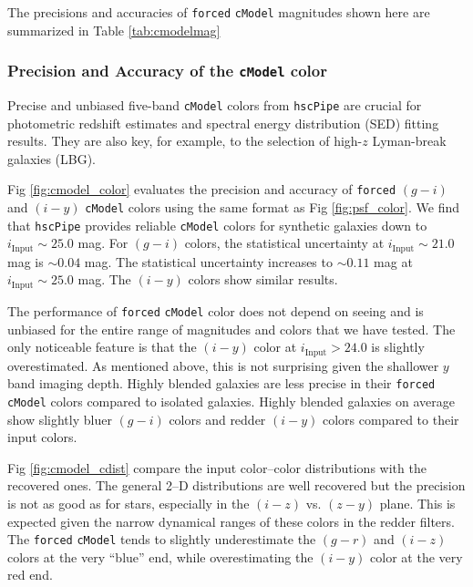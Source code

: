 \documentclass[useamsfonts]{pasj01}
\def\hscpipe{\texttt{hscPipe}}
\def\cmodel{\texttt{cModel}}
\def\forced{\texttt{forced}}
\begin{document}
	The precisions and accuracies of \forced{} \cmodel{} magnitudes shown here are 
	summarized in Table \ref{tab:cmodelmag}

\subsubsection{Precision and Accuracy of the \cmodel{} color}

    Precise and unbiased five-band \cmodel{} colors from \hscpipe{} are crucial for
    photometric redshift estimates and spectral energy distribution (SED) fitting 
    results. 
    They are also key, for example, to the selection of high-$z$ Lyman-break 
    galaxies (LBG).

    Fig \ref{fig:cmodel_color} evaluates the precision and accuracy of \forced{} 
    $(g-i)$ and $(i-y)$ \cmodel{} colors using the same format as 
    Fig \ref{fig:psf_color}. 
    We find that \hscpipe{} provides reliable \cmodel{} colors for synthetic 
    galaxies down to $i_{\mathrm{Input}}{\sim}25.0$ mag.
    For $(g-i)$ colors, the statistical uncertainty at $i_{\mathrm{Input}}{\sim}21.0$ 
    mag is ${\sim}0.04$ mag.
    The statistical uncertainty increases to ${\sim}0.11$ mag at 
    $i_{\mathrm{Input}}{\sim}25.0$ mag.
    The $(i-y)$ colors show similar results. 

    The performance of \forced{} \cmodel{} color does not depend on seeing and is 
    unbiased for the entire range of magnitudes and colors that we have tested.
    The only noticeable feature is that the $(i-y)$ color at $i_{\mathrm{Input}}>24.0$ 
    is slightly overestimated.
    As mentioned above, this is not surprising given the shallower $y$ band 
    imaging depth. 
    Highly blended galaxies are less precise in their \forced{} \cmodel{} colors 
    compared to isolated galaxies.  
    Highly blended galaxies on average show slightly bluer $(g-i)$ colors and redder  
    $(i-y)$ colors compared to their input colors.

    Fig \ref{fig:cmodel_cdist} compare the input color--color distributions with the
    recovered ones. 
    The general 2--D distributions are well recovered but the precision is not as 
    good as for stars, especially in the $(i-z)$ vs. $(z-y)$ plane.
    This is expected given the narrow dynamical ranges of these colors in the redder 
    filters.
    The \forced{} \cmodel{} tends to slightly underestimate the $(g-r)$ and $(i-z)$
    colors at the very ``blue'' end, while overestimating the $(i-y)$ color at the very
    red end.
\end{document}

